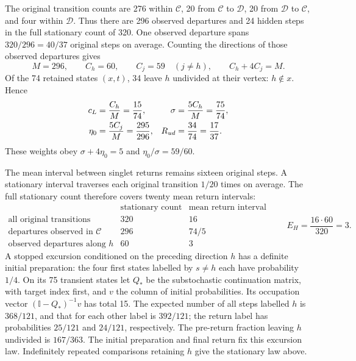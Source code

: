 \documentclass[aps,prx,onecolumn,10pt,notitlepage,nofootinbib,longbibliography]{revtex4-2}
\numberwithin{equation}{section}
\numberwithin{table}{section}
\newcommand{\Id}{\mathbb I}
\begin{document}
The original transition counts are 276 within ${\mathscr C}$, 20 from ${\mathscr C}$ to ${\mathscr D}$, 20 from ${\mathscr D}$ to ${\mathscr C}$, and four within ${\mathscr D}$. Thus there are 296 observed departures and 24 hidden steps in the full stationary count of 320. One observed departure spans $320/296=40/37$ original steps on average. Counting the directions of those observed departures gives
\begin{equation}
 M=296,\qquad C_h=60,\qquad C_j=59\quad(j\ne h),\qquad C_h+4C_j=M.
\end{equation}
Of the 74 retained states $(x,t)$, 34 leave $h$ undivided at their vertex: $h\notin x$. Hence
\begin{align}
 c_L&=\frac{C_h}{M}=\frac{15}{74},&
 \sigma&=\frac{5C_h}{M}=\frac{75}{74},\notag\\
 \eta_0&=\frac{5C_j}{M}=\frac{295}{296},&
 R_{ud}&=\frac{34}{74}=\frac{17}{37}.
 \label{eq:stationaryweights}
\end{align}
These weights obey $\sigma+4\eta_0=5$ and $\eta_0/\sigma=59/60$.

The mean interval between singlet returns remains sixteen original steps.\cite{Kac} A stationary interval traverses each original transition $1/20$ times on average. The full stationary count therefore covers twenty mean return intervals:
\begin{equation}
 \begin{array}{c|rr}
 &\text{stationary count}&\text{mean return interval}\\\hline
 \text{all original transitions}&320&16\\
 \text{departures observed in }\mathscr C&296&74/5\\
 \text{observed departures along }h&60&3
 \end{array}
 \qquad E_H=\frac{16\cdot60}{320}=3.
 \label{eq:EH}
\end{equation}
A stopped excursion conditioned on the preceding direction $h$ has a definite initial preparation: the four first states labelled by $s\ne h$ each have probability $1/4$. On its 75 transient states let $Q_*$ be the substochastic continuation matrix, with target index first, and $v$ the column of initial probabilities. Its occupation vector $(\Id-Q_*)^{-1}v$ has total 15. The expected number of all steps labelled $h$ is $368/121$, and that for each other label is $392/121$; the return label has probabilities $25/121$ and $24/121$, respectively. The pre-return fraction leaving $h$ undivided is $167/363$. The initial preparation and final return fix this excursion law. Indefinitely repeated comparisons retaining $h$ give the stationary law above.
\end{document}
